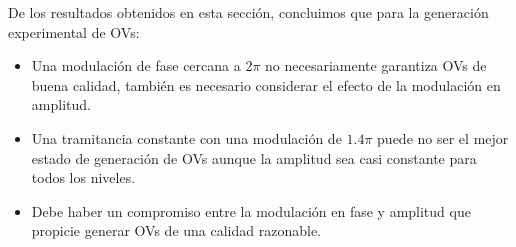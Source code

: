 De los resultados obtenidos en esta sección, concluimos que para la generación experimental de OVs:

\begin{itemize}
\item Una modulación de fase cercana a $2\pi$ no necesariamente garantiza OVs de buena calidad, también es necesario considerar el efecto de la modulación en amplitud.
\item Una tramitancia constante con una modulación de $1.4\pi$ puede no ser el mejor estado de generación de OVs aunque la amplitud sea casi constante para todos los niveles.
\item Debe haber un compromiso entre la modulación en fase y amplitud que propicie generar OVs de una calidad razonable.
\end{itemize}



%




